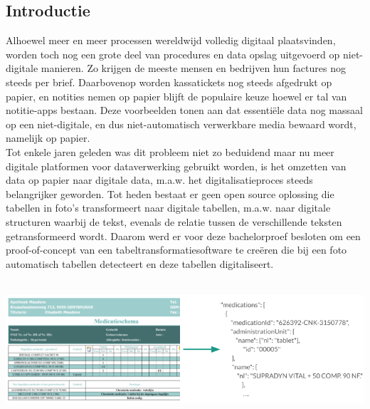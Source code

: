 \documentclass[a0,portrait]{a0poster}
\begin{document}
\begin{multicols}{2}
\color{HoGentAccent1} 
\section*{Introductie}
\color{black}
\color{black}
Alhoewel meer en meer processen wereldwijd volledig digitaal plaatsvinden, worden toch nog een grote deel van procedures en data opslag uitgevoerd op niet-digitale manieren. Zo krijgen de meeste mensen en bedrijven hun factures nog steeds per brief. Daarbovenop worden kassatickets nog steeds afgedrukt op papier, en notities nemen op papier blijft de populaire keuze hoewel er tal van notitie-apps bestaan. Deze voorbeelden tonen aan dat essentiële data nog massaal op een niet-digitale, en dus niet-automatisch verwerkbare media bewaard wordt, namelijk op papier.\\

\noindent Tot enkele jaren geleden was dit probleem niet zo beduidend maar nu meer digitale platformen voor dataverwerking gebruikt worden, is het omzetten van data op papier naar digitale data, m.a.w. het digitalisatieproces steeds belangrijker geworden. Tot heden bestaat er geen open source oplossing die tabellen in foto’s transformeert naar digitale tabellen, m.a.w. naar digitale structuren waarbij de tekst, evenals de relatie tussen de verschillende teksten getransformeerd wordt. Daarom werd er voor deze bachelorproef besloten om een proof-of-concept van een tabeltransformatiesoftware te creëren die bij een foto automatisch tabellen detecteert en deze tabellen digitaliseert.\\ \\

\begin{center}\vspace{1cm}
\includegraphics[width=1.0\linewidth]{tabel_transformatie.png}
\end{center}\vspace{1cm}


\end{multicols}
\end{document}
